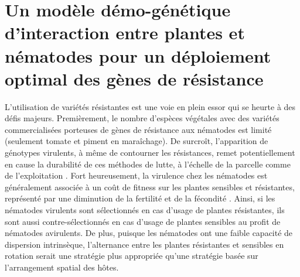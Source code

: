 




{\chapter[Deploying nematode-resistant plants ]{Un modèle démo-génétique d'interaction entre plantes et nématodes pour un déploiement optimal des gènes de résistance} \label{article}
\label{chapter_3}}
	\minitoc
	\newpage


\iffalse
Les nématodes à galles (RKNs) sont des ravageurs du sol qui ont un impact économique majeur dans le monde entier. Ils sont considérés comme l'un des pathogènes les plus importants au monde \citep{Trudgill2001}. Dans les plantes, des gènes de résistance dits majeurs, fonctionnant selon le modèle « gène pour gène », ont été identifiés.  L'utilisation au champ de plantes résistantes est perçu comme un des moyens les plus efficaces pour contrôler les nématodes \citep{Roberts1990}. 
Les résistances peuvent être utilisées de plusieurs manières dans le cadre de la lutte contre les nématodes en cultures maraîchères : (i) classiquement, en cultivant une variété agronomique porteuse d'un seul gène de résistance (ii) en rotations des cultures  entre les cultures  agronomiques  plus sensibles ou des cultures non-hôte    
 \citep{Djian-Caporalino2014}. L'utilisation de résistances en rotation peut s'intégrer aussi dans des prototypes de système de culture qui combinent   d'autres pratiques agronomiques à l'interculture : plante pièges, plantes biofumigantes et  solarisation.
\fi

\thispagestyle{empty}
L’utilisation de variétés  résistantes
est une voie en plein essor qui se heurte à des défis majeurs. Premièrement,
le nombre  d’espèces végétales avec des variétés commercialisées porteuses de gènes de résistance aux nématodes est limité (seulement tomate et piment en maraîchage). De surcroît, l'apparition de génotypes virulents, à même de contourner les résistances,  remet potentiellement en cause la durabilité de ces méthodes de lutte, à l'échelle de la parcelle comme de l'exploitation \citep{Jarquin-Barberena1991,Djian-Caporalino2011,Djian-Caporalino2014}. Fort heureusement, la virulence chez les nématodes est généralement associée à un coût de fitness sur les plantes sensibles et résistantes, représenté par une diminution de la fertilité et de la fécondité \citep{Castagnone-Sereno2007,Djian-Caporalino2011}. Ainsi, si les nématodes virulents sont sélectionnés en cas d'usage de plantes résistantes, ils sont aussi contre-sélectionnés en cas d'usage de plantes sensibles au profit de nématodes avirulents.
De plus, puisque les nématodes ont une faible capacité de dispersion intrinsèque, l'alternance entre les  plantes résistantes et sensibles en rotation serait  une stratégie plus appropriée qu'une stratégie basée sur l’arrangement spatial des hôtes.


